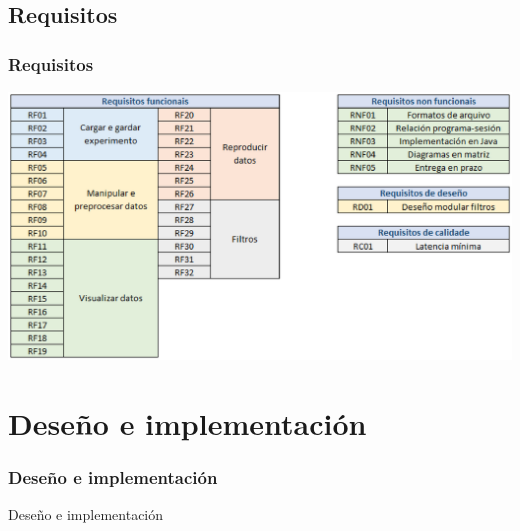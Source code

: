 \documentclass{beamer}
\begin{document}
\subsection{Requisitos}
\begin{frame}
\frametitle{Requisitos} 
\includegraphics[width=\textwidth,height=\textheight,keepaspectratio]{figuras/docrequisitos}
\end{frame}


\section{Deseño e implementación}
\begin{frame}
\frametitle{Deseño e implementación} 
Deseño e implementación
\end{frame}
\end{document}
